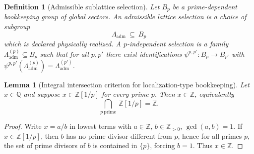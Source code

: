 \documentclass[11pt]{article}
\newtheorem{lemma}[theorem]{Lemma}
\newtheorem{definition}[theorem]{Definition}
\theoremstyle{remark}
\begin{document}
{\begin{definition}[Admissible sublattice selection]\label{D:def:admissible_lattice}
Let $B_{p}$ be a prime-dependent bookkeeping group of global sectors.
An admissible lattice selection is a choice of subgroup
\begin{equation}
\Lambda_{\mathrm{adm}}\ \subseteq\ B_{p}
\label{D:eq:Lambda_adm}
\end{equation}
which is declared physically realized.
A $p$-independent selection is a family $\Lambda_{\mathrm{adm}}^{(p)}\subseteq B_{p}$ such that for all $p,p'$ there exist identifications $\psi^{p,p'}:B_{p}\to B_{p'}$ with $\psi^{p,p'}(\Lambda_{\mathrm{adm}}^{(p)})=\Lambda_{\mathrm{adm}}^{(p')}$.
\end{definition}

\begin{lemma}[Integral intersection criterion for localization-type bookkeeping]\label{D:lem:intersection}
Let $x\in\mathbb Q$ and suppose $x\in \mathbb Z[1/p]$ for every prime $p$.
Then $x\in\mathbb Z$, equivalently
\begin{equation}
\bigcap_{p\ \mathrm{prime}}\ \mathbb Z[1/p]=\mathbb Z.
\label{D:eq:intersection}
\end{equation}
\end{lemma}

\begin{proof}
Write $x=a/b$ in lowest terms with $a\in\mathbb Z$, $b\in\mathbb Z_{>0}$, $\gcd(a,b)=1$.
If $x\in\mathbb Z[1/p]$, then $b$ has no prime divisor different from $p$, hence for all primes $p$, the set of prime divisors of $b$ is contained in $\{p\}$, forcing $b=1$.
Thus $x\in\mathbb Z$.
\end{proof}

}
\end{document}
